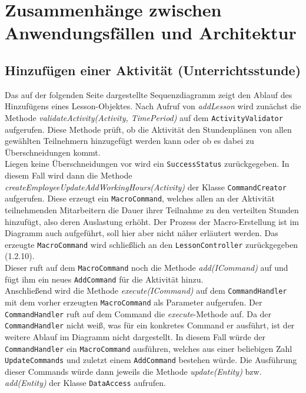\documentclass[fontsize=12pt,paper=a4,twoside]{scrartcl}
\begin{document}
\section[Zusammenhänge zwischen Anwendungsfällen und Architektur]{Zusammenhänge zwischen Anwendungsfällen und Architektur}
\label{sec:anwendungsfaelle}

\subsection{Hinzufügen einer Aktivität (Unterrichtsstunde)}
Das auf der folgenden Seite dargestellte Sequenzdiagramm zeigt den Ablauf des Hinzufügens eines Lesson-Objektes. Nach Aufruf von \textit{addLesson} wird zunächst die Methode \textit{validateActivity(Activity, TimePeriod)} auf dem \texttt{ActivityValidator} aufgerufen. Diese Methode prüft, ob die Aktivität den Stundenplänen von allen gewählten Teilnehmern hinzugefügt werden kann oder ob es dabei zu Überschneidungen kommt.\\
Liegen keine Überschneidungen vor wird ein \texttt{SuccessStatus} zurückgegeben. In diesem Fall wird dann die Methode \textit{createEmployeeUpdateAddWorkingHours(Activity)} der Klasse \texttt{CommandCreator} aufgerufen. Diese erzeugt ein \texttt{MacroCommand}, welches allen an der Aktivität teilnehmenden Mitarbeitern die Dauer ihrer Teilnahme zu den verteilten Stunden hinzufügt, also deren Auslastung erhöht. Der Prozess der Macro-Erstellung ist im Diagramm auch aufgeführt, soll hier aber nicht näher erläutert werden. Das erzeugte \texttt{MacroCommand} wird schließlich an den \texttt{LessonController} zurückgegeben (1.2.10).\\
Dieser ruft auf dem \texttt{MacroCommand} noch die Methode \textit{add(ICommand)} auf und fügt ihm ein neues \texttt{AddCommand} für die Aktivität hinzu. \\
Anschließend wird die Methode \textit{execute(ICommand)} auf dem \texttt{CommandHandler} mit dem vorher erzeugten \texttt{MacroCommand} als Parameter aufgerufen. Der \texttt{CommandHandler} ruft auf dem Command die \textit{execute}-Methode auf. Da der \texttt{CommandHandler} nicht weiß, was für ein konkretes Command er ausführt, ist der weitere Ablauf im Diagramm nicht dargestellt. In diesem Fall würde der \texttt{CommandHandler} ein \texttt{MacroCommand} ausführen, welches aus einer beliebigen Zahl \texttt{UpdateCommands} und zuletzt einem \texttt{AddCommand} bestehen würde. Die Ausführung dieser Commands würde dann jeweils die Methode \textit{update(Entity)} bzw. \textit{add(Entity)} der Klasse \texttt{DataAccess} aufrufen.\\
\end{document}
